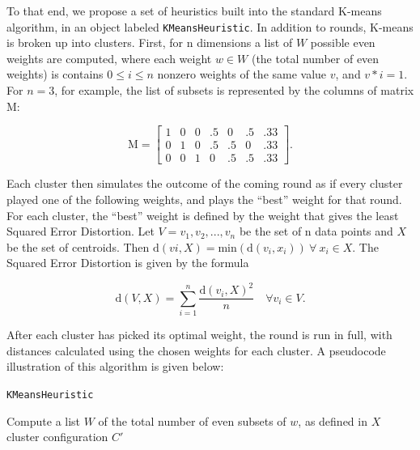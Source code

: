 \documentclass[12pt,twocolumn,titlepage]{article}
\begin{document}
To that end, we propose a set of heuristics built into the standard K-means algorithm, in an object labeled \texttt{KMeansHeuristic}. In addition to rounds, K-means is broken up into clusters. First, for n dimensions a list of $W$ possible even weights are computed, where each weight $w \in W$ (the total number of even weights) is contains $0 \leq i \leq n$ nonzero weights of the same value $v$, and $v*i = 1$. For $n = 3$, for example, the list of subsets 
is represented by the columns of matrix $\mathrm{M}$:

\begin{equation}\label{}
\mathrm{M} = \begin{bmatrix}
1 & 0 & 0 & .5 & 0 & .5 & .33 \\
0 & 1 & 0 & .5 & .5 & 0 & .33 \\
0 & 0 & 1 & 0 & .5 & .5 & .33
\end{bmatrix}.
\end{equation}

Each cluster then simulates the outcome of the coming round as if every cluster played one of the following weights, and plays the ``best'' weight for that round. For each cluster, the ``best'' weight is defined by the weight that gives the least Squared Error Distortion. Let $V = {v_1,v_2,...,v_n}$ be the set of n data points and $X$ be the set of centroids. Then $\mathrm{d}(vi, X) = \mathrm{min}(\mathrm{d}(v_i, x_i))\: \forall \: x_i \in X$. The Squared Error Distortion is given by the formula 

$$
\mathrm{d}(V,X) = \sum_{i=1}^{n} \frac{\mathrm{d}(v_i, X)^2}{n} \quad \forall v_i \in V.
$$

After each cluster has picked its optimal weight, the round is run in full, with distances calculated using the chosen weights for each cluster. A pseudocode illustration of this algorithm is given below:

\begin{algorithm}
 \caption{\texttt{KMeansHeuristic}}\label{algoCPOR2}
 Compute a list $W$ of the total number of even subsets of $w$, as defined in $X$\;
 \KwRet cluster configuration $C'$\;
\end{algorithm}
\end{document}
